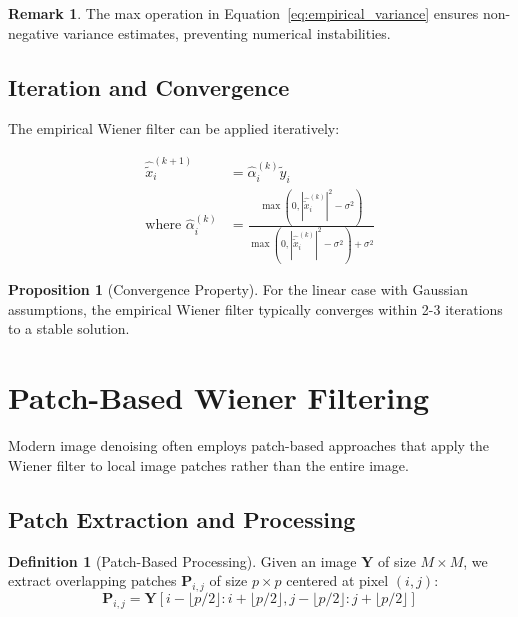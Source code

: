\documentclass[12pt]{article}
\theoremstyle{definition}
\newtheorem{proposition}[theorem]{Proposition}
\newtheorem{definition}[theorem]{Definition}
\newtheorem{remark}[theorem]{Remark}
\begin{document}
\begin{remark}
    The max operation in Equation~\ref{eq:empirical_variance} ensures non-negative variance estimates, preventing numerical instabilities.
\end{remark}

\subsection{Iteration and Convergence}
\label{subsec:iteration}

The empirical Wiener filter can be applied iteratively:

\begin{align}
    \hat{\tilde{x}}_i^{(k+1)}          & = \hat{\alpha}_i^{(k)} \tilde{y}_i                                                                                   \\
    \text{where } \hat{\alpha}_i^{(k)} & = \frac{\max(0, |\hat{\tilde{x}}_i^{(k)}|^2 - \sigma^2)}{\max(0, |\hat{\tilde{x}}_i^{(k)}|^2 - \sigma^2) + \sigma^2}
\end{align}

\begin{proposition}[Convergence Property]
    \label{prop:convergence}
    For the linear case with Gaussian assumptions, the empirical Wiener filter typically converges within 2-3 iterations to a stable solution.
\end{proposition}

\newpage


\section{Patch-Based Wiener Filtering}
\label{sec:patch_based}

Modern image denoising often employs patch-based approaches that apply the Wiener filter to local image patches rather than the entire image.

\subsection{Patch Extraction and Processing}
\label{subsec:patch_processing}

\begin{definition}[Patch-Based Processing]
    \label{def:patch_processing}
    Given an image $\mathbf{Y}$ of size $M \times M$, we extract overlapping patches $\mathbf{P}_{i,j}$ of size $p \times p$ centered at pixel $(i,j)$:
    \begin{equation}
        \mathbf{P}_{i,j} = \mathbf{Y}[i-\lfloor p/2 \rfloor : i+\lfloor p/2 \rfloor, j-\lfloor p/2 \rfloor : j+\lfloor p/2 \rfloor]
    \end{equation}
\end{definition}
\end{document}
